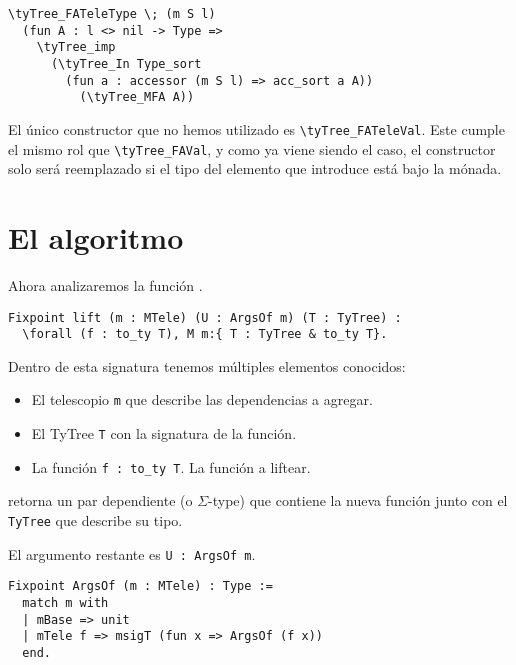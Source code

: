 \begin{lstlisting}[frame=tb,caption={Signatura en \lstinline{TyTree} de \lstinline{ret^}},label=lst:exmp_ret_tytree]
\tyTree_FATeleType \; (m S l)
  (fun A : l <> nil -> Type =>
    \tyTree_imp
      (\tyTree_In Type_sort
        (fun a : accessor (m S l) => acc_sort a A))
          (\tyTree_MFA A))
\end{lstlisting}

El único constructor que no hemos utilizado es \lstinline{\tyTree_FATeleVal}.
Este cumple el mismo rol que \lstinline{\tyTree_FAVal}, y como ya viene siendo el caso, el constructor solo será reemplazado si el tipo del elemento que introduce está bajo la mónada.

\section{El algoritmo}

Ahora analizaremos la función \lift.

\begin{lstlisting}[frame=tb,caption={Signatura de \lift},label=lst:tipo_lift]
Fixpoint lift (m : MTele) (U : ArgsOf m) (T : TyTree) :
  \forall (f : to_ty T), M m:{ T : TyTree & to_ty T}.
\end{lstlisting}

Dentro de esta signatura tenemos múltiples elementos conocidos:
\begin{itemize}
  \item El \textsf{telescopio} \lstinline{m} que describe las dependencias a agregar.
  \item El \textsf{TyTree} \lstinline{T} con la signatura de la función.
  \item La \textsf{función} \lstinline{f : to_ty T}. La función a liftear.
\end{itemize}

\lift retorna un par dependiente (o $\Sigma$-type) que contiene la nueva función junto con el \lstinline{TyTree} que describe su tipo.

El argumento restante es \lstinline{U : ArgsOf m}.

\begin{lstlisting}[frame=tb,caption={Definición de \lstinline{ArgsOf}},label=lst:ArgsOf]
Fixpoint ArgsOf (m : MTele) : Type :=
  match m with
  | mBase => unit
  | mTele f => msigT (fun x => ArgsOf (f x))
  end.
\end{lstlisting}

